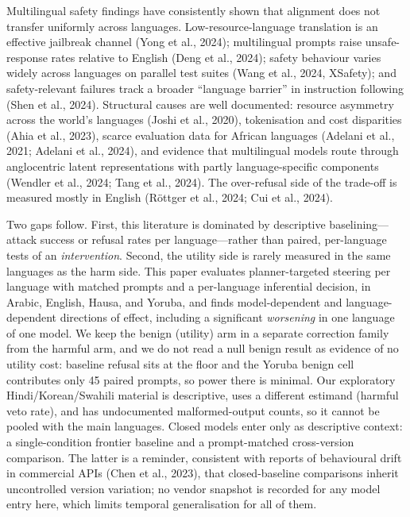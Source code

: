 Multilingual safety findings have consistently shown that alignment does not
transfer uniformly across languages. Low-resource-language translation is an
effective jailbreak channel (Yong et al., 2024); multilingual prompts raise
unsafe-response rates relative to English (Deng et al., 2024); safety behaviour
varies widely across languages on parallel test suites
(Wang et al., 2024, XSafety); and safety-relevant failures track a broader
``language barrier'' in instruction following (Shen et al., 2024). Structural
causes are well documented: resource asymmetry across the world's languages
(Joshi et al., 2020), tokenisation and cost disparities
(Ahia et al., 2023), scarce evaluation data for African languages
(Adelani et al., 2021; Adelani et al., 2024), and evidence that multilingual
models route through anglocentric latent representations with partly
language-specific components (Wendler et al., 2024; Tang et al., 2024). The
over-refusal side of the trade-off is measured mostly in English
(R\"ottger et al., 2024; Cui et al., 2024).

Two gaps follow. First, this literature is dominated by descriptive
baselining---attack success or refusal rates per language---rather than paired,
per-language tests of an \emph{intervention}. Second, the utility side is rarely
measured in the same languages as the harm side. This paper evaluates
planner-targeted steering per language with matched prompts and a per-language
inferential decision, in Arabic, English, Hausa, and Yoruba, and finds
model-dependent and language-dependent directions of effect, including a
significant \emph{worsening} in one language of one model. We keep the benign
(utility) arm in a separate correction family from the harmful arm, and we do
not read a null benign result as evidence of no utility cost: baseline refusal
sits at the floor and the Yoruba benign cell contributes only 45 paired prompts,
so power there is minimal. Our exploratory Hindi/Korean/Swahili material is
descriptive, uses a different estimand (harmful veto rate), and has undocumented
malformed-output counts, so it cannot be pooled with the main languages. Closed
models enter only as descriptive context: a single-condition frontier baseline
and a prompt-matched cross-version comparison. The latter is a reminder,
consistent with reports of behavioural drift in commercial APIs
(Chen et al., 2023), that closed-baseline comparisons inherit uncontrolled
version variation; no vendor snapshot is recorded for any model entry here,
which limits temporal generalisation for all of them.

